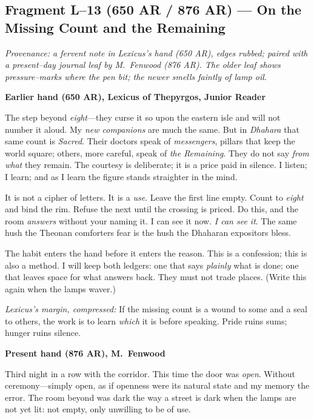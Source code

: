 \documentclass[11pt]{article}
\numberwithin{equation}{section} %
\theoremstyle{plain} %
\theoremstyle{definition} %
\theoremstyle{remark} %
\begin{document}
\subsection{Fragment L--13 (650 AR / 876 AR) — On the Missing Count and the Remaining}
\label{frag:l13}

\noindent\textit{Provenance: a fervent note in Lexicus’s hand (650 AR), edges rubbed; paired with a present–day journal leaf by M.\ Fenwood (876 AR). The older leaf shows pressure–marks where the pen bit; the newer smells faintly of lamp oil.}

\medskip
\noindent\textbf{Earlier hand (650 AR), Lexicus of Thepyrgos, Junior Reader}

The step beyond \emph{eight}—they curse it so upon the eastern isle and will not number it aloud. My \emph{new companions} are much the same. But in \textit{Dhahara} that same count is \emph{Sacred}. Their doctors speak of \emph{messengers}, pillars that keep the world square; others, more careful, speak of \emph{the Remaining}. They do not say \emph{from what} they remain. The courtesy is deliberate; it is a price paid in silence. I listen; I learn; and as I learn the figure stands straighter in the mind.

It is not a cipher of letters. It is a \emph{use}. Leave the first line empty. Count to \emph{eight} and bind the rim. Refuse the next until the crossing is priced. Do this, and the room \emph{answers} without your naming it. I can see it now. \emph{I can see it}. The same hush the Theonan comforters fear is the hush the Dhaharan expositors bless.

The habit enters the hand before it enters the reason. This is a confession; this is also a method. I will keep both ledgers: one that says \emph{plainly} what is done; one that leaves space for what answers back. They must not trade places. (Write this again when the lamps waver.)

\medskip
\noindent\textit{Lexicus’s margin, compressed:} If the missing count is a wound to some and a seal to others, the work is to learn \emph{which} it is before speaking. Pride ruins sums; hunger ruins silence.

\medskip
\noindent\textbf{Present hand (876 AR), M.\ Fenwood}

Third night in a row with the corridor. This time the door was \emph{open}. Without ceremony—simply open, as if openness were its natural state and my memory the error. The room beyond was dark the way a street is dark when the lamps are not yet lit: not empty, only unwilling to be of use.
\end{document}
